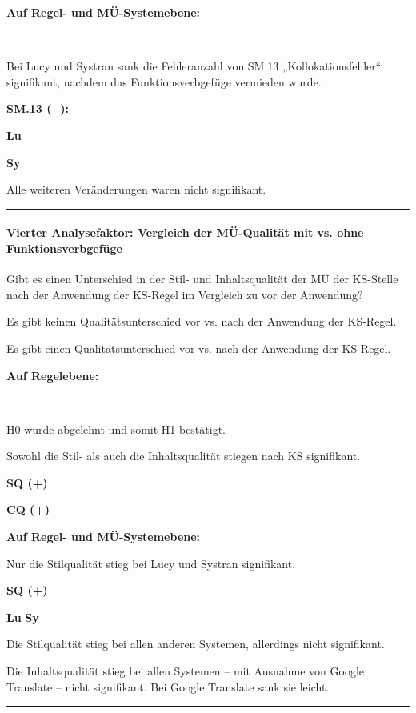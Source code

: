 \noindent
\parbox[t]{.8\textwidth}{\textbf{Auf Regel- und MÜ-Systemebene:}}\\
\noindent
\parbox[t]{.8\textwidth}{
Bei Lucy und Systran sank die Fehleranzahl von SM.13 „Kollokationsfehler“ signifikant, nachdem das Funktionsverbgefüge vermieden wurde.}
\parbox[t]{.04\textwidth}{}
\colorbox{smGreen}{\parbox[t]{.15\textwidth}{\textbf{SM.13 ($-$):}

{ \textbf{Lu}}

{ \textbf{Sy}}}}

\medskip
\noindent
\parbox[t]{.8\textwidth}{Alle weiteren Veränderungen waren nicht signifikant.}
\hrule
\paragraph*{Vierter Analysefaktor: Vergleich der MÜ-Qualität mit vs. ohne Funktionsverbgefüge}
\begin{description}[font=\normalfont\bfseries]
\item [Fragestellung:] Gibt es einen Unterschied in der Stil- und Inhaltsqualität der MÜ der KS-Stelle nach der Anwendung der KS-Regel im Vergleich zu vor der Anwendung?
\item [H0 --] Es gibt keinen Qualitätsunterschied vor vs. nach der Anwendung der KS-Regel.
\item [H1 --] Es gibt einen Qualitätsunterschied vor vs. nach der Anwendung der KS-Regel.
\item [Resultat]
\end{description}
\noindent
\parbox[t]{.8\textwidth}{\textbf{Auf Regelebene:}}\\
\noindent
\parbox[t]{.8\textwidth}{
H0 wurde abgelehnt und somit H1 bestätigt.

Sowohl die Stil- als auch die Inhaltsqualität stiegen nach KS signifikant.}
\parbox[t]{.04\textwidth}{}
\colorbox{smGreen}{\parbox[t]{.15\textwidth}{\textbf{SQ (+)}

 \textbf{CQ (+)}\\
 }}

\noindent
\parbox[t]{.8\textwidth}{\textbf{Auf Regel- und MÜ-Systemebene:}

 Nur die Stilqualität stieg bei Lucy und Systran signifikant.}
 \parbox[t]{.04\textwidth}{}
 \colorbox{smGreen}{\parbox[t]{.15\textwidth}{\textbf{SQ (+)}

 { \textbf{Lu}} { \textbf{Sy}}}}

\medskip
 \noindent
 \parbox[t]{.8\textwidth}{Die Stilqualität stieg bei allen anderen Systemen, allerdings nicht signifikant.

Die Inhaltsqualität stieg bei allen Systemen -- mit Ausnahme von Google Translate -- nicht signifikant. Bei Google Translate sank sie leicht.}
\medskip
\hrule
